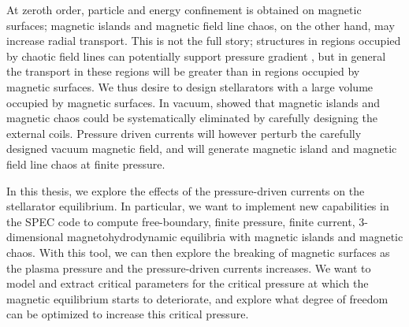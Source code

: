 \documentclass[my_thesis.tex]{subfiles}
\begin{document}


At zeroth order, particle and energy confinement is obtained on magnetic surfaces; magnetic islands and magnetic field line chaos, on the other hand, may increase radial transport. This is not the full story; structures in regions occupied by chaotic field lines can potentially support pressure gradient \citep{Hudson2008}, but in general the transport in these regions will be greater than in regions occupied by magnetic surfaces. We thus desire to design stellarators with a large volume occupied by magnetic surfaces. In vacuum, \citet{Hanson1984a,Cary1986} showed that magnetic islands and magnetic chaos could be systematically eliminated by carefully designing the external coils. Pressure driven currents will  however perturb the carefully designed vacuum magnetic field, and will generate magnetic island and magnetic field line chaos at finite pressure.

In this thesis, we explore the effects of the pressure-driven currents on the stellarator equilibrium. In particular, we want to implement new capabilities in the \ac{SPEC} code to compute free-boundary, finite pressure, finite current, 3-dimensional magnetohydrodynamic equilibria with magnetic islands and magnetic chaos. With this tool, we can then explore the breaking of magnetic surfaces as the plasma pressure and the pressure-driven currents increases. We want to model and extract critical parameters for the critical pressure at which the magnetic equilibrium starts to deteriorate, and explore what degree of freedom can be optimized to increase this critical pressure.
\end{document}
